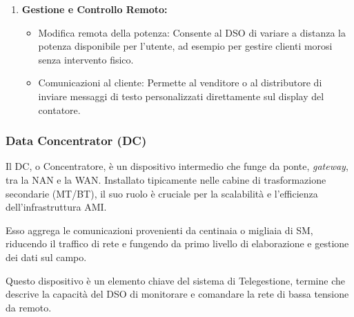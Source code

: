 \begin{enumerate}
    \item \textbf{Gestione e Controllo Remoto:}
    \begin{itemize}
        \item Modifica remota della potenza: Consente al DSO di variare a distanza la potenza disponibile per l'utente, ad esempio per gestire clienti morosi senza intervento fisico.
        \item Comunicazioni al cliente: Permette al venditore o al distributore di inviare messaggi di testo personalizzati direttamente sul display del contatore.
    \end{itemize}
\end{enumerate}






\subsubsection{Data Concentrator (DC)}






Il DC, o Concentratore, è un dispositivo intermedio che funge da ponte, \textit{gateway}, tra la NAN e la WAN. Installato tipicamente nelle cabine di trasformazione secondarie (MT/BT), il suo ruolo è cruciale per la scalabilità e l'efficienza dell'infrastruttura AMI. 

Esso aggrega le comunicazioni provenienti da centinaia o migliaia di SM, riducendo il traffico di rete e fungendo da primo livello di elaborazione e gestione dei dati sul campo.

Questo dispositivo è un elemento chiave del sistema di Telegestione, termine che descrive la capacità del DSO di monitorare e comandare la rete di bassa tensione da remoto.


